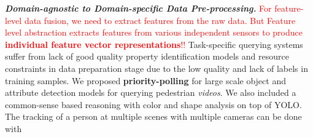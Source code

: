 \documentclass[9pt]{article}
\newcommand*\heading[1]{\large\textbf{\textit{#1.}}}
\begin{document}
\heading{Domain-agnostic to Domain-specific Data Pre-processing}
\textcolor{red}{For feature-level data fusion, we need to extract features from the raw data. But Feature level abstraction extracts features from various independent sensors to produce \textbf{individual feature vector representations}!!}
Task-specific querying systems suffer from lack of good quality property identification models and resource constraints in data preparation stage due to the low quality and lack of labels in training samples.
We proposed \textbf{priority-polling} \cite{stonebraker2020surveillance} for large scale object and attribute detection models for querying pedestrian \textit{videos}.
We also included a common-sense based reasoning with color and shape analysis \cite{stonebraker2020surveillance, solaiman2021applying} on top of YOLO. The tracking of a person at multiple scenes with multiple cameras can be done with 
\end{document}
